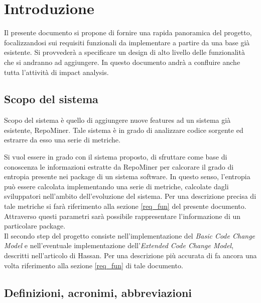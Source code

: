\chapter{Introduzione}
Il presente documento si propone di fornire una rapida panoramica del progetto, focalizzandosi sui requisiti funzionali da implementare a partire da una base già esistente. Si provvederà a specificare un design di alto livello delle funzionalità che si andranno ad aggiungere. In questo documento andrà a confluire anche tutta l'attività di impact analysis.

\section{Scopo del sistema}
Scopo del sistema è quello di aggiungere nuove features ad un sistema già esistente, RepoMiner. Tale sistema è in grado di analizzare codice sorgente ed estrarre da esso una serie di metriche. 

Si vuol essere in grado con il sistema proposto, di sfruttare come base di conoscenza le informazioni estratte da RepoMiner per calcorare il grado di entropia presente nei package di un sistema software. In questo senso, l'entropia può essere calcolata implementando una serie di metriche, calcolate dagli sviluppatori nell'ambito dell'evoluzione del sistema. Per una descrizione precisa di tale metriche si farà riferimento alla sezione \ref{req_fun} del presente documento. Attraverso questi parametri sarà possibile rappresentare l'informazione di un particolare package.\\

Il secondo step del progetto consiste nell'implementazione del \textit{Basic Code Change Model} e nell'eventuale implementazione dell'\textit{Extended Code Change Model}, descritti nell'articolo di Hassan\cite{hassan2009predicting}. Per una descrizione più accurata di fa ancora una volta riferimento alla sezione \ref{req_fun} di tale documento.

\section{Definizioni, acronimi, abbreviazioni}

